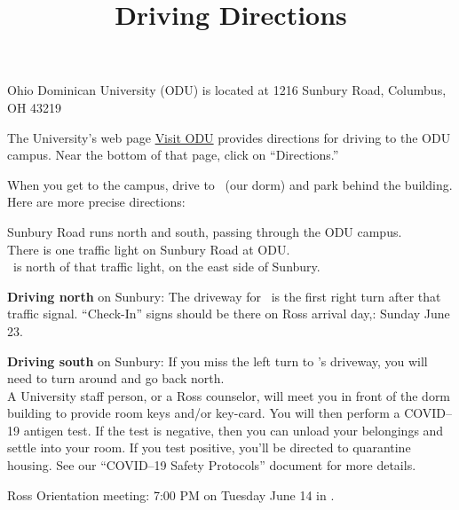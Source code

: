 \documentclass{ross}
\title{Driving Directions}
\newcommand{\spa}{\hspace*{1cm}}
\begin{document}
\maketitle

Ohio Dominican University (ODU) is located at 1216 Sunbury Road, Columbus, OH 43219

The University's web page 
\href{https://www.ohiodominican.edu/future-students/admissions-aid/visit-odu/locations}{Visit ODU}  provides directions for driving to the ODU campus.  Near the bottom of that page, click on ``Directions.''   

When you get to the campus, drive to \dormname\ (our dorm) and park behind the building.  \\
Here are more precise directions:

\spa Sunbury Road runs north and south, passing through the ODU campus.\\
\spa There is one traffic light on Sunbury Road at ODU. \\
\spa \dormname\ is north of that traffic light, on the east side of Sunbury.
 
 {\bf Driving north} on Sunbury: The driveway for  \dormname\ is the first right turn after that traffic signal.  ``Check-In'' signs should be there on Ross arrival day,: Sunday June 23.

 {\bf Driving south} on Sunbury: If you miss the left turn to \dormname's driveway,  you will need to turn around and go back north.\\

A University staff person, or a Ross counselor, will meet you in front of the dorm building to provide room keys and/or key-card.  You will then perform a COVID--19 antigen test.  If the test is negative, then you can unload your belongings and settle into your room. If you test positive, you'll be directed to quarantine housing. See our ``COVID--19 Safety Protocols'' document for more details.

Ross Orientation meeting:  7:00 PM on Tuesday June 14 in \orientationlocation.
\end{document}
